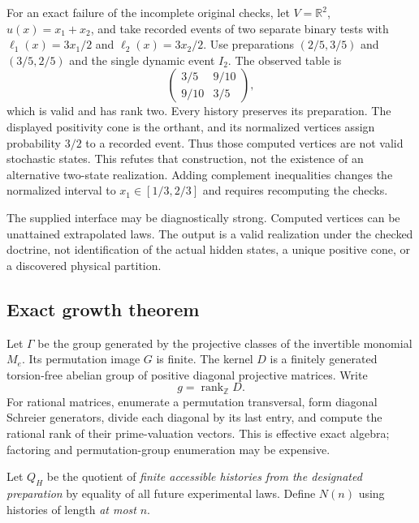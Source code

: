 \documentclass[11pt]{article}
\theoremstyle{remark}
\newcommand{\RR}{\mathbb R}
\newcommand{\ZZ}{\mathbb Z}
\newcommand{\rank}{\operatorname{rank}}
\begin{document}
For an exact failure of the incomplete original checks, let $V=\RR^2$, $u(x)=x_1+x_2$, and take recorded events of two separate binary tests with $\ell_1(x)=3x_1/2$ and $\ell_2(x)=3x_2/2$. Use preparations $(2/5,3/5)$ and $(3/5,2/5)$ and the single dynamic event $I_2$. The observed table is
\[
 \begin{pmatrix}3/5&9/10\\9/10&3/5\end{pmatrix},
\]
which is valid and has rank two. Every history preserves its preparation. The displayed positivity cone is the orthant, and its normalized vertices assign probability $3/2$ to a recorded event. Thus those computed vertices are not valid stochastic states. This refutes that construction, not the existence of an alternative two-state realization. Adding complement inequalities changes the normalized interval to $x_1\in[1/3,2/3]$ and requires recomputing the checks.

The supplied interface may be diagnostically strong. Computed vertices can be unattained extrapolated laws. The output is a valid realization under the checked doctrine, not identification of the actual hidden states, a unique positive cone, or a discovered physical partition.

\subsection{Exact growth theorem}

Let $\Gamma$ be the group generated by the projective classes of the invertible monomial $M_e$. Its permutation image $G$ is finite. The kernel $D$ is a finitely generated torsion-free abelian group of positive diagonal projective matrices. Write
\[
 g=\rank_{\ZZ}D.
\]
For rational matrices, enumerate a permutation transversal, form diagonal Schreier generators, divide each diagonal by its last entry, and compute the rational rank of their prime-valuation vectors. This is effective exact algebra; factoring and permutation-group enumeration may be expensive.

Let $Q_H$ be the quotient of \emph{finite accessible histories from the designated preparation} by equality of all future experimental laws. Define $N(n)$ using histories of length \emph{at most} $n$.
\end{document}
